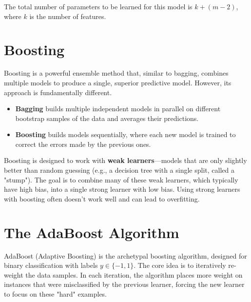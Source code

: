 \documentclass{article}
\begin{document}
\begin{multicols}{2}
	The total number of parameters to be learned for this model is $k + (m-2)$, where $k$ is the number of features.

	\section{Boosting}
	Boosting is a powerful ensemble method that, similar to bagging, combines multiple models to produce a single, superior predictive model. However, its approach is fundamentally different.

	\begin{itemize}
		\item \textbf{Bagging} builds multiple independent models in parallel on different bootstrap samples of the data and averages their predictions.
		\item \textbf{Boosting} builds models sequentially, where each new model is trained to correct the errors made by the previous ones.
	\end{itemize}
	Boosting is designed to work with \textbf{weak learners}—models that are only slightly better than random guessing (e.g., a decision tree with a single split, called a "stump"). The goal is to combine many of these weak learners, which typically have high bias, into a single strong learner with low bias. Using strong learners with boosting often doesn't work well and can lead to overfitting.

	\section{The AdaBoost Algorithm}
	AdaBoost (Adaptive Boosting) is the archetypal boosting algorithm, designed for binary classification with labels $y \in \{-1, 1\}$.
	The core idea is to iteratively re-weight the data samples. In each iteration, the algorithm places more weight on instances that were misclassified by the previous learner, forcing the new learner to focus on these "hard" examples.


\end{multicols}
\end{document}
